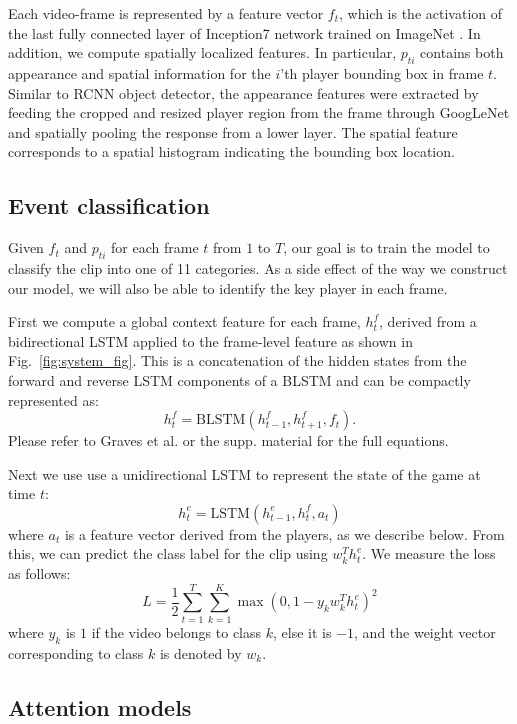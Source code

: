 Each video-frame  is represented by a feature vector $f_t$, which is the activation
of the last fully connected layer of Inception7 network 
\cite{} trained on ImageNet \cite{}.  In addition, we compute spatially localized features.  In particular,
$p_{ti}$ contains both appearance and spatial information for the $i$'th
player bounding box in frame $t$. Similar to RCNN object detector\cite{},
the appearance features were extracted by feeding
the cropped and resized player region from the frame through GoogLeNet and
spatially pooling the response from a lower layer. The spatial feature
corresponds to a spatial histogram indicating the bounding box location.  

\subsection{Event classification}

Given $f_t$ and $p_{ti}$ for each frame $t$ from $1$ to $T$, our goal
is to train the model to classify the clip into one of 11 categories. As a side
effect of the way we construct our model, we will also be able to identify the
key player in each frame.

First we compute a global context feature for each frame, $h_t^f$, derived from
a bidirectional LSTM applied to the frame-level feature as shown in Fig.~\ref{fig:system_fig}.
This is a concatenation of the hidden states from the forward and reverse LSTM
components of a BLSTM and can be compactly represented as:
\[
h_t^f = \mbox{BLSTM}(h_{t-1}^f, h_{t+1}^f, f_t).
\]Please refer to Graves et al. \cite{Graves_2013} or the supp. material
for the full equations.

Next we use use a unidirectional LSTM to represent the state of the
game at time $t$:
\[
h_t^e = \mbox{LSTM}(h_{t-1}^e, h_t^f, a_t)
\]
where $a_t$ is a feature vector derived from the players, as we
describe below.
From this, we can predict the class label for the clip using $w_k^T
h_t^e$. We measure the loss as follows:
\begin{equation}
  L =   \frac{1}{2} \sum_{t=1}^T \sum_{k = 1}^K \max (0, 1 - y_k w_k^T h^e_t)^2
\end{equation} 
where $y_k$ is $1$ if the video belongs to class $k$,
else it is $-1$, and the weight vector corresponding to
class $k$ is denoted by $w_k$.

\subsection{Attention models}

